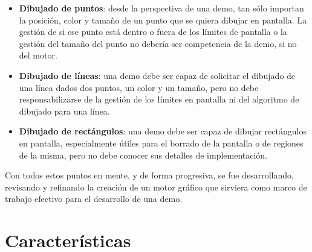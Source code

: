 \begin{itemize}
		\begin{itemize}
			\item \textbf{Dibujado de puntos}: desde la perspectiva de una demo, tan sólo importan la posición, color y tamaño de un punto que se quiera dibujar en pantalla. La gestión de si ese punto está dentro o fuera de los límites de pantalla o la gestión del tamaño del punto no debería ser competencia de la demo, si no del motor.
			\item \textbf{Dibujado de líneas}: una demo debe ser capaz de solicitar el dibujado de una línea dados dos puntos, un color y un tamaño, pero no debe responsabilizarse de la gestión de los límites en pantalla ni del algoritmo de dibujado para una línea.
			\item \textbf{Dibujado de rectángulos}: una demo debe ser capaz de dibujar rectángulos en pantalla, especialmente útiles para el borrado de la pantalla o de regiones de la misma, pero no debe conocer sus detalles de implementación.
		\end{itemize}
\end{itemize}

Con todos estos puntos en mente, y de forma progresiva, se fue desarrollando, revisando y refinando la creación de un motor gráfico que sirviera como marco de trabajo efectivo para el desarrollo de una demo.

\section{Características}

%
%
%
%
%
%
%
%
%

